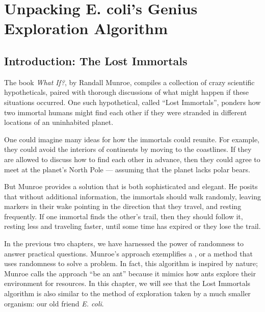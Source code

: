 \chapter[Unpacking E. coli’s Genius Exploration Algorithm]{Unpacking E. coli’s Genius Exploration Algorithm}
\label{chapter:chemotaxis}
\renewcommand{\chaptertitle}{Unpacking E. coli’s Genius Exploration Algorithm}

\FloatBarrier

\section{Introduction: The Lost Immortals}
\label{sec:introduction}

The book \textit{What If?}, by Randall Munroe, compiles a collection of crazy scientific hypotheticals, paired with thorough discussions of what might happen if these situations occurred. One such hypothetical, called ``Lost Immortals'', ponders how two immortal humans might find each other if they were stranded in different locations of an uninhabited planet.

One could imagine many ideas for how the immortals could reunite. For example, they could avoid the interiors of continents by moving to the coastlines. If they are allowed to discuss how to find each other in advance, then they could agree to meet at the planet's North Pole --- assuming that the planet lacks polar bears.

But Munroe provides a solution that is both sophisticated and elegant. He posits that without additional information, the immortals should walk randomly, leaving markers in their wake pointing in the direction that they travel, and resting frequently. If one immortal finds the other's trail, then they should follow it, resting less and traveling faster, until some time has expired or they lose the trail.

In the previous two chapters, we have harnessed the power of randomness to answer practical questions. Munroe's approach exemplifies a , or a method that uses randomness to solve a problem. In fact, this algorithm is inspired by nature; Munroe calls the approach ``be an ant'' because it mimics how ants explore their environment for resources. In this chapter, we will see that the Lost Immortals algorithm is also similar to the method of exploration taken by a much smaller organism: our old friend \textit{E. coli}.

